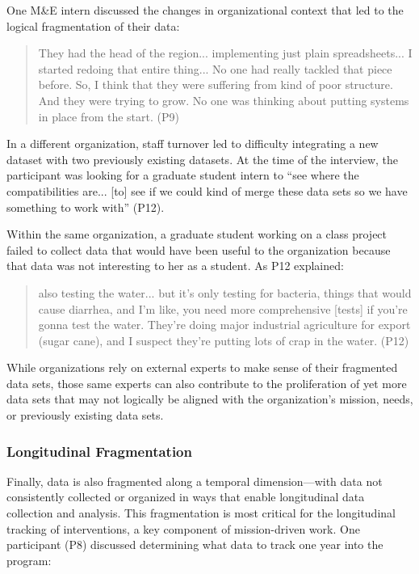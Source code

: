 One M\&E intern discussed the changes in organizational context that led to the logical fragmentation of their data:

\begin{quote}\singlespacing They had the head of the region... implementing just plain spreadsheets... I started redoing that entire thing... No one had really tackled that piece before. So, I think that they were suffering from kind of poor structure. And they were trying to grow. No one was thinking about putting systems in place from the start. (P9)\end{quote}

In a different organization, staff turnover led to difficulty integrating a new dataset with two previously existing datasets. At the time of the interview, the participant was looking for a graduate student intern to “see where the compatibilities are... [to] see if we could kind of merge these data sets so we have something to work with” (P12).

Within the same organization, a graduate student working on a class project failed to collect data that would have been useful to the organization because that data was not interesting to her as a student. As P12 explained:

\begin{quote} also testing the water... but it’s only testing for bacteria, things that would cause diarrhea, and I’m like, you need more comprehensive [tests] if you’re gonna test the water. They’re doing major industrial agriculture for export (sugar cane), and I suspect they’re putting lots of crap in the water. (P12)\end{quote}

While organizations rely on external experts to make sense of their fragmented data sets, those same experts can also contribute to the proliferation of yet more data sets that may not logically be aligned with the organization’s mission, needs, or previously existing data sets.

\subsubsection{Longitudinal Fragmentation}
Finally, data is also fragmented along a temporal dimension---with data not consistently collected or organized in ways that enable longitudinal data collection and analysis. This fragmentation is most critical for the longitudinal tracking of interventions, a key component of mission-driven work. One participant (P8) discussed determining what data to track one year into the program:

